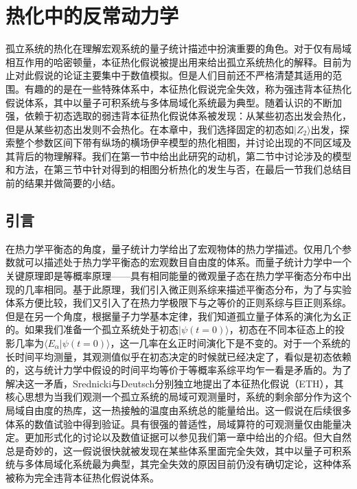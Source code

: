 \chapter{热化中的反常动力学}\label{chap:scar}

孤立系统的热化在理解宏观系统的量子统计描述中扮演重要的角色。对于仅有局域相互作用的哈密顿量，本征热化假说被提出用来给出孤立系统热化的解释。目前为止对此假说的论证主要集中于数值模拟。但是人们目前还不严格清楚其适用的范围。有趣的的是在一些特殊体系中，本征热化假说完全失效，称为强违背本征热化假说体系，其中以量子可积系统与多体局域化系统最为典型。随着认识的不断加强，依赖于初态选取的弱违背本征热化假说体系被发现：从某些初态出发会热化，但是从某些初态出发则不会热化。在本章中，我们选择固定的初态如$|Z_2\rangle$出发，探索整个参数区间下带有纵场的横场伊辛模型的热化相图，并讨论出现的不同区域及其背后的物理解释。我们在第一节中给出此研究的动机，第二节中讨论涉及的模型和方法，在第三节中针对得到的相图分析热化的发生与否，在最后一节我们总结目前的结果并做简要的小结。

\section{引言}
在热力学平衡态的角度，量子统计力学给出了宏观物体的热力学描述。仅用几个参数就可以描述处于热力学平衡态的宏观数目自由度的体系。而量子统计力学中一个关键原理即是等概率原理——具有相同能量的微观量子态在热力学平衡态分布中出现的几率相同。基于此原理，我们引入微正则系综来描述平衡态分布，为了与实验体系方便比较，我们又引入了在热力学极限下与之等价的正则系综与巨正则系综。但是在另一个角度，根据量子力学基本定律，我们知道孤立量子体系的演化为幺正的。如果我们准备一个孤立系统处于初态$|\psi(t=0)\rangle$，初态在不同本征态上的投影几率为$\langle E_\alpha|\psi(t=0)\rangle$，这一几率在幺正时间演化下是不变的。对于一个系统的长时间平均测量，其观测值似乎在初态决定的时候就已经决定了，看似是初态依赖的，这与统计力学中假设的时间平均等价于等概率系综平均乍一看是矛盾的。为了解决这一矛盾，Srednicki\cite{Srednicki1994chaos}与Deutsch\cite{Deutsch1991quantum}分别独立地提出了本征热化假说（ETH），其核心思想为当我们观测一个孤立系统的局域可观测量时，系统的剩余部分作为这个局域自由度的热库，这一热接触的温度由系统总的能量给出。这一假说在后续很多体系的数值试验中得到验证。具有很强的普适性，局域算符的可观测量仅由能量决定。更加形式化的讨论以及数值证据可以参见我们第一章中给出的介绍。但大自然总是奇妙的，这一假说很快就被发现在某些体系里面完全失效，其中以量子可积系统\cite{kinoshita2006quantum,Rigol2007Relaxation,Calabrese2011Quantum,essler2016quench,vidmar2016generalized}与多体局域化系统最为典型\cite{basko2006metal,Serbyn2013local,Huse2014Phenomenology}，其完全失效的原因目前仍没有确切定论，这种体系被称为完全违背本征热化假说体系。

